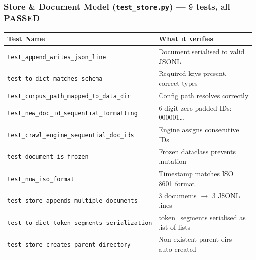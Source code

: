 \documentclass[12pt]{article}
\begin{document}
\subsubsection*{Store \& Document Model (\texttt{test\_store.py}) --- 9 tests, all PASSED}
\begin{table}[H]
\centering
\footnotesize
\begin{tabular}{|p{7cm}|p{7.5cm}|}
\hline
\textbf{Test Name} & \textbf{What it verifies} \\
\hline
\texttt{test\_append\_writes\_json\_line}               & Document serialised to valid JSONL \\
\texttt{test\_to\_dict\_matches\_schema}                & Required keys present, correct types \\
\texttt{test\_corpus\_path\_mapped\_to\_data\_dir}      & Config path resolves correctly \\
\texttt{test\_new\_doc\_id\_sequential\_formatting}     & 6-digit zero-padded IDs: 000001\ldots \\
\texttt{test\_crawl\_engine\_sequential\_doc\_ids}      & Engine assigns consecutive IDs \\
\texttt{test\_document\_is\_frozen}                     & Frozen dataclass prevents mutation \\
\texttt{test\_now\_iso\_format}                         & Timestamp matches ISO 8601 format \\
\texttt{test\_store\_appends\_multiple\_documents}      & 3 documents $\to$ 3 JSONL lines \\
\texttt{test\_to\_dict\_token\_segments\_serialization} & token\_segments serialised as list of lists \\
\texttt{test\_store\_creates\_parent\_directory}        & Non-existent parent dirs auto-created \\
\hline
\end{tabular}
\end{table}
\end{document}
